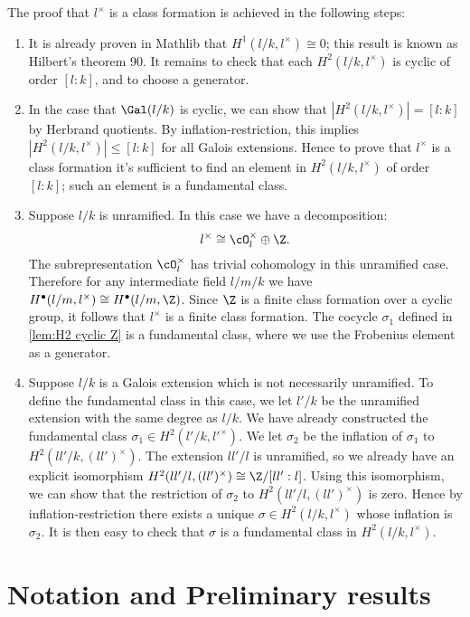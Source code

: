 The proof that $l^\times$ is a class formation is achieved in the following steps:
\begin{enumerate}
	\item
	It is already proven in Mathlib that $H^1(l/k,l^\times) \cong 0$;
	this result is known as Hilbert's theorem 90.
	It remains to check that each $H^2(l/k,l^\times)$ is cyclic of order $[l:k]$, and to
	choose a generator.
	\item
	In the case that $\Gal(l/k)$ is cyclic, we can show that $|H^2(l/k,l^\times)| = [l:k]$ by
	Herbrand quotients. By inflation-restriction, this implies $|H^2(l/k,l^\times)| \le [l:k]$
	for all Galois extensions. Hence to prove that $l^\times$ is a class formation it's sufficient to
	find an element in $H^2(l/k,l^\times)$ of order $[l:k]$; such an element is a fundamental class.
	\item
	Suppose $l/k$ is unramified. In this case we have a decomposition:
	\[
		l ^\times \cong \cO_l^\times \oplus \Z.
	\]
	The subrepresentation $\cO_l^\times$ has trivial cohomology in this unramified case.
	Therefore for any intermediate field $l/m/k$ we have
	$H^\bullet(l/m,l^\times) \cong H^\bullet(l/m,\Z)$.
	Since $\Z$ is a finite class formation over a cyclic group, it follows that $l^\times$ is a
	finite class formation.
	The cocycle $\sigma_1$ defined in \ref{lem:H2 cyclic Z} is a fundamental class,
	where we use the Frobenius element as a generator.
	\item
	Suppose $l/k$ is a Galois extension which is not necessarily unramified. To define the
	fundamental class in this case, we let $l'/k$ be the unramified extension with the same degree as
	$l/k$. We have already constructed the fundamental class $\sigma_1 \in H^2(l'/k, l'^\times)$.
	We let $\sigma_2$ be the inflation of $\sigma_1$ to $H^2(ll'/k, (ll')^\times)$.
	The extension $ll' / l$ is unramified, so we already have an explicit isomorphism
	$H^2(ll'/l, (ll')^\times) \cong \Z / [ll':l]$.
	Using this isomorphism, we can show that the restriction of $\sigma_2$
	to $H^2(ll'/l, (ll')^\times)$ is zero.
	Hence by inflation-restriction there exists a unique $\sigma \in H^2(l/k, l^\times)$ whose
	inflation is $\sigma_2$.
	It is then easy to check that $\sigma$ is a fundamental class in $H^2(l/k,l^\times)$.
\end{enumerate}





\section{Notation and Preliminary results}

